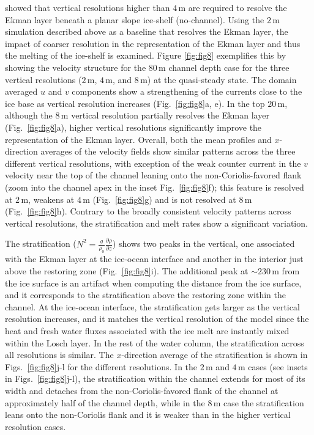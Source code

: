\documentclass[draft]{agujournal2019}
\begin{document}
\citet{Patmore_Turbulence_2023} showed that vertical resolutions higher than $4\,\mathrm{m}$ are required to resolve the Ekman layer beneath a planar slope ice-shelf (no-channel). Using the $2\,\mathrm{m}$ simulation described above as a baseline that resolves the Ekman layer, the impact of coarser resolution in the representation of the Ekman layer and thus the melting of the ice-shelf is examined.
Figure \ref{fig:fig8} exemplifies this by showing the velocity structure for the $80\,\mathrm{m}$ channel depth case for the three vertical resolutions ($2\,\mathrm{m}$, $4\,\mathrm{m}$, and $8\,\mathrm{m}$) at the quasi-steady state. The domain averaged $u$ and $v$ components show a strengthening of the currents close to the ice base as vertical resolution increases (Fig.~\ref{fig:fig8}a, e). In the top $20\,\mathrm{m}$, although the $8\,\mathrm{m}$ vertical resolution partially resolves the Ekman layer (Fig.~\ref{fig:fig8}a), higher vertical resolutions significantly improve the representation of the Ekman layer. Overall, both the mean profiles and $x$-direction averages of the velocity fields show similar patterns across the three different vertical resolutions, with exception of the weak counter current in the $v$ velocity near the top of the channel leaning onto the non-Coriolis-favored flank (zoom into the channel apex in the inset Fig.~\ref{fig:fig8}f); this feature is resolved at $2\,\mathrm{m}$, weakens at $4\,\mathrm{m}$ (Fig.~\ref{fig:fig8}g) and is not resolved at $8\,\mathrm{m}$ (Fig.~\ref{fig:fig8}h). Contrary to the broadly consistent velocity patterns across vertical resolutions, the stratification and melt rates show a significant variation.


The stratification ($N^2=\frac{g}{\rho_0}\frac{\partial \rho}{\partial z}$) shows two peaks in the vertical, one associated with the Ekman layer at the ice-ocean interface and another in the interior just above the restoring zone (Fig.~\ref{fig:fig8}i). The additional peak at $\sim230\,\mathrm{m}$ from the ice surface is an artifact when computing the distance from the ice surface, and it corresponds to the stratification above the restoring zone within the channel. At the ice-ocean interface, the stratification gets larger as the vertical resolution increases, and it matches the vertical resolution of the model since the heat and fresh water fluxes associated with the ice melt are instantly mixed within the Losch layer. In the rest of the water column, the stratification across all resolutions is similar. The $x$-direction average of the stratification is shown in Figs.~\ref{fig:fig8}j-l for the different resolutions. In the $2\,\mathrm{m}$ and $4\,\mathrm{m}$ cases (see insets in Figs.~\ref{fig:fig8}j-l), the stratification within the channel extends for most of its width and detaches from the non-Coriolis-favored flank of the channel at approximately half of the channel depth, while in the $8\,\mathrm{m}$ case the stratification leans onto the non-Coriolis flank and it is weaker than in the higher vertical resolution cases. 
\end{document}
